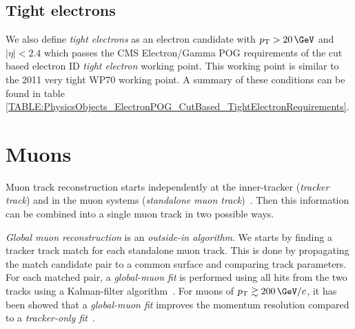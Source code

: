 \subsection{Tight electrons}



We also define \textit{tight electrons} as an electron candidate with $\pt>20\,\GeV$ and $|\eta|<2.4$ which passes the \gls{CMS} Electron/Gamma \gls{POG} requirements of the cut based electron \gls{ID} \textit{tight electron} working point. This working point is similar to the 2011 very tight WP70 working point. A summary of these conditions can be found in table \ref{TABLE:PhysicsObjects_ElectronPOG_CutBased_TightElectronRequirements}.



\section{Muons}
\label{SECTION:EventReconstructionAndSimulation_Muons}


Muon track reconstruction starts independently at the inner-tracker (\textit{tracker track}) and in the muon systems (\textit{standalone muon track})~\cite{ARTICLE:CMSMuonReconstruction7TeV}. Then this information can be combined into a single muon track in two possible ways.

\textit{Global muon reconstruction} is an \textit{outside-in algorithm}. We starts by finding a tracker track match for each standalone muon track. This is done by propagating the match candidate pair to a common surface and comparing track parameters. For each matched pair, a \textit{global-muon fit} is performed using all hits from the two tracks using a Kalman-filter algorithm~\cite{ARTICLE:KalmanFilteringTrackVertexFitting}. For muons of $\pt\gtrsim 200\,\GeV/c$, it has been showed that a \textit{global-muon fit} improves the momentum resolution compared to a \textit{tracker-only fit}~\cite{CMSTDR:CMSPhysicsVol1, ARTICLE:CMSPerformanceMuonReconstructionCosmicRay}.

